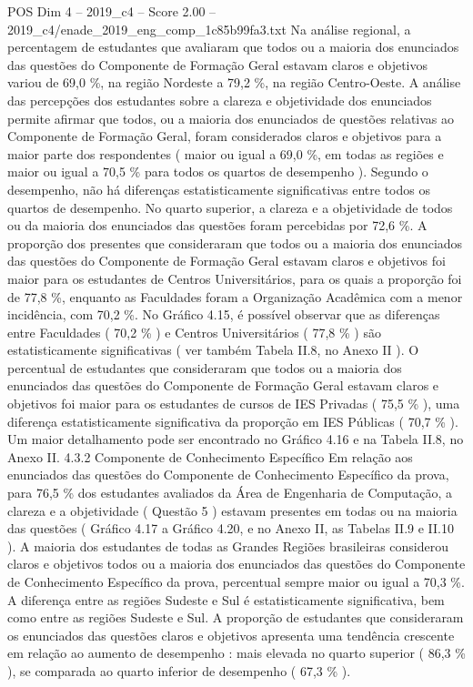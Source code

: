 \begin{textsample}{POS Dim 4 – 2019\_c4 – Score 2.00 – 2019\_c4/enade\_2019\_eng\_comp\_1c85b99fa3.txt}
Na análise regional, a percentagem de estudantes que avaliaram que todos ou a maioria dos enunciados das questões do Componente de Formação Geral estavam claros e objetivos variou de 69,0 \%, na região Nordeste a 79,2 \%, na região Centro-Oeste.
A análise das percepções dos estudantes sobre a clareza e objetividade dos enunciados permite afirmar que todos, ou a maioria dos enunciados de questões relativas ao Componente de Formação Geral, foram considerados claros e objetivos para a maior parte dos respondentes ( maior ou igual a 69,0 \%, em todas as regiões e maior ou igual a 70,5 \% para todos os quartos de desempenho ).
Segundo o desempenho, não há diferenças estatisticamente significativas entre todos os quartos de desempenho.
No quarto superior, a clareza e a objetividade de todos ou da maioria dos enunciados das questões foram percebidas por 72,6 \%.
A proporção dos presentes que consideraram que todos ou a maioria dos enunciados das questões do Componente de Formação Geral estavam claros e objetivos foi maior para os estudantes de Centros Universitários, para os quais a proporção foi de 77,8 \%, enquanto as Faculdades foram a Organização Acadêmica com a menor incidência, com 70,2 \%.
No Gráfico 4.15, é possível observar que as diferenças entre Faculdades ( 70,2 \% ) e Centros Universitários ( 77,8 \% ) são estatisticamente significativas ( ver também Tabela II.8, no Anexo II ).
O percentual de estudantes que consideraram que todos ou a maioria dos enunciados das questões do Componente de Formação Geral estavam claros e objetivos foi maior para os estudantes de cursos de IES Privadas ( 75,5 \% ), uma diferença estatisticamente significativa da proporção em IES Públicas ( 70,7 \% ).
Um maior detalhamento pode ser encontrado no Gráfico 4.16 e na Tabela II.8, no Anexo II. 4.3.2 Componente de Conhecimento Específico Em relação aos enunciados das questões do Componente de Conhecimento Específico da prova, para 76,5 \% dos estudantes avaliados da Área de Engenharia de Computação, a clareza e a objetividade ( Questão 5 ) estavam presentes em todas ou na maioria das questões ( Gráfico 4.17 a Gráfico 4.20, e no Anexo II, as Tabelas II.9 e II.10 ).
A maioria dos estudantes de todas as Grandes Regiões brasileiras considerou claros e objetivos todos ou a maioria dos enunciados das questões do Componente de Conhecimento Específico da prova, percentual sempre maior ou igual a 70,3 \%.
A diferença entre as regiões Sudeste e Sul é estatisticamente significativa, bem como entre as regiões Sudeste e Sul.
A proporção de estudantes que consideraram os enunciados das questões claros e objetivos apresenta uma tendência crescente em relação ao aumento de desempenho : mais elevada no quarto superior ( 86,3 \% ), se comparada ao quarto inferior de desempenho ( 67,3 \% ).

\end{textsample}
